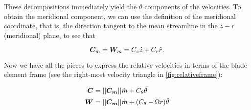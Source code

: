 \noindent These decompositions immediately yield the \(\theta\) components of the velocities.
%
To obtain the meridional component, we can use the definition of the meridional coordinate, that is, the direction tangent to the mean streamline in the \(z-r\) (meridional) plane, to see that

\begin{equation}
    \label{eqn:vmwm}
        \bm{C}_m = \bm{W}_m = C_z \hat{z} + C_r \hat{r}.
\end{equation}

\noindent Now we have all the pieces to express the relative velocities in terms of the blade element frame (see the right-most velocity triangle in \cref{fig:relativeframe}):

\begin{align}
    \bm{C} &= ||\bm{C_m}||\hat{m} + C_\theta \hat{\theta} \\
    \label{eqn:inflowvelocity}
    \bm{W} &= ||\bm{C_m}||\hat{m} + (C_\theta - \Omega r) \hat{\theta}
\end{align}
